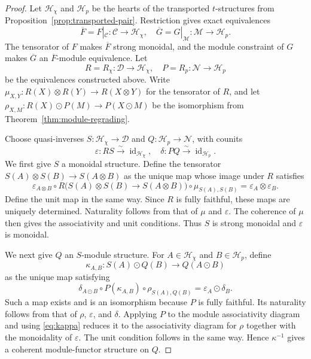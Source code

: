\documentclass[10pt,a4paper]{amsart}
\newcommand{\C}{\mathcal C}
\newcommand{\D}{\mathcal D}
\newcommand{\Hh}{\mathcal H}
\newcommand{\M}{\mathcal M}
\newcommand{\N}{\mathcal N}
\DeclareMathOperator{\id}{id}
\begin{document}
\begin{proof}
Let $\Hh_\chi$ and $\Hh_p$ be the hearts of the transported $t$-structures from Proposition~\ref{prop:transported-pair}. Restriction gives exact equivalences
\begin{equation*}
\overline F=F|_{\C}:\C\rightarrow\Hh_\chi,\quad \overline G=G|_{\M}:\M\rightarrow\Hh_p.
\end{equation*}
The tensorator of $F$ makes $\overline F$ strong monoidal, and the module constraint of $G$ makes $\overline G$ an $\overline F$-module equivalence. Let
\begin{equation*}
R=R_\chi:\D\rightarrow\Hh_\chi,\quad P=R_p:\N\rightarrow\Hh_p
\end{equation*}
be the equivalences constructed above. Write $\mu_{X,Y}: R(X)\otimes R(Y)\to R(X\otimes Y)$ for the tensorator of $R$, and let $\rho_{X,M}: R(X)\odot P(M)\to P(X\odot M)$ be the isomorphism from Theorem~\ref{thm:module-regrading}.

Choose quasi-inverses $S:\Hh_\chi\to\D$ and $Q:\Hh_p\to\N$, with counits
\begin{equation*}
\varepsilon: RS\xrightarrow{\sim}\id_{\Hh_\chi},\quad
\delta: PQ\xrightarrow{\sim}\id_{\Hh_p}.
\end{equation*}
We first give $S$ a monoidal structure. Define the tensorator $S(A)\otimes S(B)\to S(A\otimes B)$ as the unique map whose image under $R$ satisfies
\begin{equation}\label{eq:S-tensorator}
\varepsilon_{A\otimes B}\circ R\bigl(S(A)\otimes S(B)\to S(A\otimes B)\bigr)\circ\mu_{S(A),S(B)}
=\varepsilon_A\otimes\varepsilon_B.
\end{equation}
Define the unit map in the same way. Since $R$ is fully faithful, these maps are uniquely determined. Naturality follows from that of $\mu$ and $\varepsilon$. The coherence of $\mu$ then gives the associativity and unit conditions. Thus $S$ is strong monoidal and $\varepsilon$ is monoidal.

We next give $Q$ an $S$-module structure. For $A\in\Hh_\chi$ and $B\in\Hh_p$, define
\begin{equation*}
\kappa_{A,B}: S(A)\odot Q(B)\rightarrow Q(A\odot B)
\end{equation*}
as the unique map satisfying
\begin{equation}\label{eq:kappa}
\delta_{A\odot B}\circ P(\kappa_{A,B})\circ\rho_{S(A),Q(B)}
=\varepsilon_A\odot\delta_B.
\end{equation}
Such a map exists and is an isomorphism because $P$ is fully faithful. Its naturality follows from that of $\rho$, $\varepsilon$, and $\delta$. Applying $P$ to the module associativity diagram and using \eqref{eq:kappa} reduces it to the associativity diagram for $\rho$ together with the monoidality of $\varepsilon$. The unit condition follows in the same way. Hence $\kappa^{-1}$ gives a coherent module-functor structure on $Q$.


\end{proof}
\end{document}
